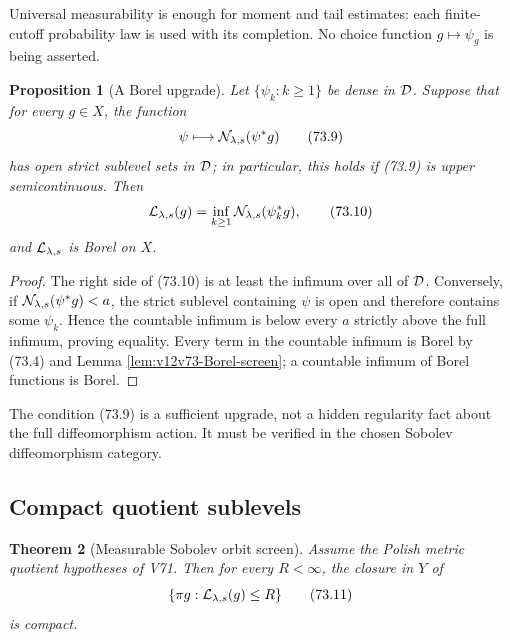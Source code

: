 \documentclass[11pt]{article}
\newtheorem{theorem}{Theorem}[section]
\newtheorem{proposition}[theorem]{Proposition}
\theoremstyle{remark}
\begin{document}
Universal measurability is enough for moment and tail estimates:
each finite-cutoff probability law is used with its completion.
No choice function \(g\mapsto\psi_g\) is being asserted.

\begin{proposition}[A Borel upgrade]
\label{prop:v12v73-Borel-upgrade}
Let \(\{\psi_k:k\geq1\}\) be dense in \({\cal D}\).  Suppose that for
every \(g\in X\), the function
\[
                  \psi\longmapsto
                  {\cal N}_{\lambda,s}(\psi^*g)              \tag{73.9}
\]
has open strict sublevel sets in \({\cal D}\); in particular, this
holds if (73.9) is upper semicontinuous.  Then
\begin{equation}
 {\cal L}_{\lambda,s}(g)
 =\inf_{k\geq1}{\cal N}_{\lambda,s}(\psi_k^*g),              \tag{73.10}
\end{equation}
and \({\cal L}_{\lambda,s}\) is Borel on \(X\).
\end{proposition}

\begin{proof}
The right side of (73.10) is at least the infimum over all of
\({\cal D}\).  Conversely, if
\({\cal N}_{\lambda,s}(\psi^*g)<a\), the strict sublevel containing
\(\psi\) is open and therefore contains some \(\psi_k\).  Hence the
countable infimum is below every \(a\) strictly above the full
infimum, proving equality.  Every term in the countable infimum is
Borel by (73.4) and Lemma \ref{lem:v12v73-Borel-screen}; a countable
infimum of Borel functions is Borel.
\end{proof}

The condition (73.9) is a sufficient upgrade, not a hidden
regularity fact about the full diffeomorphism action.  It must be
verified in the chosen Sobolev diffeomorphism category.

\subsection{Compact quotient sublevels}

\begin{theorem}[Measurable Sobolev orbit screen]
\label{thm:v12v73-compact-screen}
Assume the Polish metric quotient hypotheses of V71.  Then for every
\(R<\infty\), the closure in \(Y\) of
\begin{equation}
 \{\pi g:{\cal L}_{\lambda,s}(g)\leq R\}                    \tag{73.11}
\end{equation}
is compact.
\end{theorem}
\end{document}

